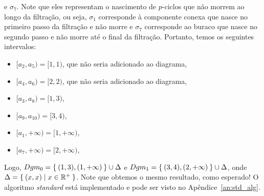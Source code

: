 e $\sigma_7$. Note que eles representam o nascimento de $p$-ciclos que não morrem
ao longo da filtração, ou seja, $\sigma_1$ corresponde à componente conexa que
nasce no primeiro passo da filtração e não morre e $\sigma_7$ corresponde ao
buraco que nasce no segundo passo e não morre até o final da filtração.
Portanto, temos os seguintes intervalos:
\begin{itemize}
  \item $[a_2,a_5) = [1,1)$, que não seria adicionado ao diagrama,
  \item $[a_4,a_6) = [2,2)$, que não seria adicionado ao diagrama,
  \item $[a_3,a_8) = [1,3)$,
  \item $[a_9,a_{10}) = [3,4)$,
  \item $[a_1,+\infty) = [1,+\infty)$,
  \item $[a_7,+\infty) = [2,+\infty)$,
\end{itemize}
Logo, $Dgm_0 = \Set{(1,3), (1,+\infty)} \cup \Delta$ e $Dgm_1 = \Set{(3,4),
(2,+\infty)} \cup \Delta$, onde $\Delta = \Set{(x,x) | x \in \mathbb{R}^+}$.
Note que obtemos o mesmo resultado, como esperado! O algoritmo \textit{standard}
está implementado e pode ser visto no Apêndice~\ref{an:std_alg}.
